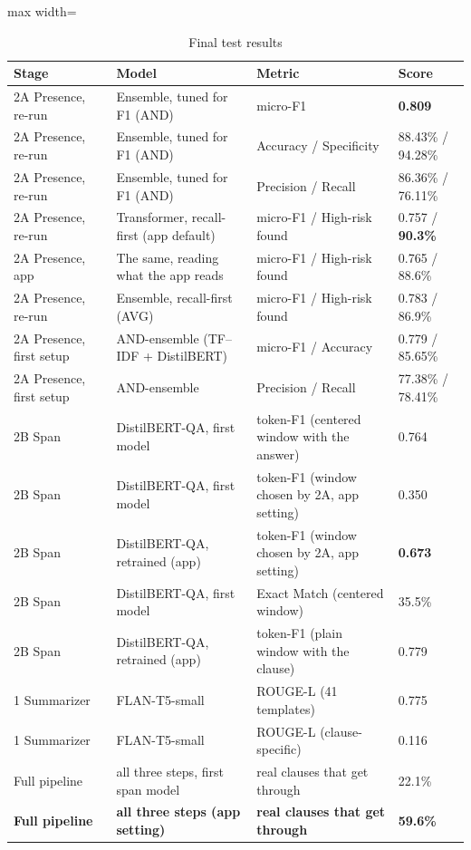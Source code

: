 \begin{table}[!htbp]
\centering
\caption{Final test results}
\label{tab:scorecard}
\small
\begin{adjustbox}{max width=\textwidth}
\begin{tabular}{llll}
\toprule
\textbf{Stage} & \textbf{Model} & \textbf{Metric} & \textbf{Score}\\
\midrule
2A Presence, re-run & Ensemble, tuned for F1 (AND) & micro-F1 & \textbf{0.809}\\
2A Presence, re-run & Ensemble, tuned for F1 (AND) & Accuracy / Specificity & 88.43\% / 94.28\%\\
2A Presence, re-run & Ensemble, tuned for F1 (AND) & Precision / Recall & 86.36\% / 76.11\%\\
2A Presence, re-run & Transformer, recall-first (app default) & micro-F1 / High-risk found & 0.757 / \textbf{90.3\%}\\
2A Presence, app & The same, reading what the app reads & micro-F1 / High-risk found & 0.765 / 88.6\%\\
2A Presence, re-run & Ensemble, recall-first (AVG) & micro-F1 / High-risk found & 0.783 / 86.9\%\\
2A Presence, first setup & AND-ensemble (TF--IDF + DistilBERT) & micro-F1 / Accuracy & 0.779 / 85.65\%\\
2A Presence, first setup & AND-ensemble & Precision / Recall     & 77.38\% / 78.41\%\\
2B Span     & DistilBERT-QA, first model & token-F1 (centered window with the answer) & 0.764\\
2B Span     & DistilBERT-QA, first model & token-F1 (window chosen by 2A, app setting) & 0.350\\
2B Span     & DistilBERT-QA, retrained (app) & token-F1 (window chosen by 2A, app setting) & \textbf{0.673}\\
2B Span     & DistilBERT-QA, first model & Exact Match (centered window)  & 35.5\%\\
2B Span     & DistilBERT-QA, retrained (app) & token-F1 (plain window with the clause) & 0.779\\
1 Summarizer & FLAN-T5-small & ROUGE-L (41 templates)  & 0.775\\
1 Summarizer & FLAN-T5-small & ROUGE-L (clause-specific) & 0.116\\
\midrule
Full pipeline & all three steps, first span model & real clauses that get through & 22.1\%\\
\textbf{Full pipeline} & \textbf{all three steps (app setting)} & \textbf{real clauses that get through} & \textbf{59.6\%}\\
\bottomrule
\end{tabular}
\end{adjustbox}
\end{table}

